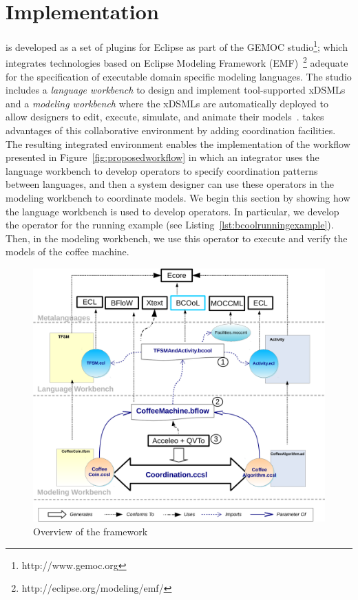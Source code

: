 \section{Implementation}
\label{section:bcoollengbench}

\bcool is developed as a set of plugins for Eclipse as part of the GEMOC studio\footnote{http://www.gemoc.org}; which integrates technologies based on Eclipse Modeling Framework (EMF)~\footnote{http://eclipse.org/modeling/emf/} adequate for the specification of executable domain specific modeling languages. The studio includes a \emph{language workbench} to design and implement tool-supported xDSMLs and a \emph{modeling workbench} where the xDSMLs are automatically deployed to allow designers to edit, execute, simulate, and animate their models~\cite{ttc15bib}. \bcool takes advantages of this collaborative environment by adding coordination facilities. The resulting integrated environment enables the implementation of the workflow presented in Figure~\ref{fig:proposedworkflow} in which an integrator uses the language workbench to develop \bcool operators to specify coordination patterns between languages, and then a system designer can use these operators in the modeling workbench to  coordinate models. We begin this section by showing how the language workbench is used to develop \bcool operators. In particular, we develop the operator for the running example (see Listing~\ref{lst:bcoolrunningexample}). Then, in the modeling workbench, we use this operator to execute and verify the models of the coffee machine. 

\begin{figure}[h]
	\begin{center}
		\includegraphics[width=1\textwidth]{bcool/figs/bcooltechnos}
		\caption{Overview of the \bcool framework}
		\label{fig:bcooltechnos}
	\end{center}
\end{figure}

